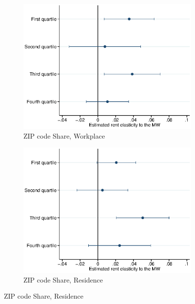 \begin{figure}[htb!]
\begin{subfigure}[b]{.5\textwidth}
	\end{subfigure}\\
	\begin{subfigure}[b]{.5\textwidth}
		\caption{ZIP code Share, Workplace}
		\includegraphics[width = \textwidth]
			{../../analysis/first_differences_expmw/output/fd_static_heter_walall_29y_lowinc_zsh_st_qtl.eps}
	\end{subfigure}%
	\begin{subfigure}[b]{.5\textwidth}
		\caption{ZIP code Share, Residence}
		\includegraphics[width = \textwidth]
			{../../analysis/first_differences_expmw/output/fd_static_heter_halall_29y_lowinc_zsh_st_qtl.eps}
	\end{subfigure}
	\begin{minipage}{0.95\textwidth}\footnotesize

\end{minipage}
\end{figure}
